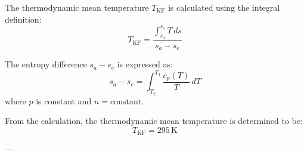 The thermodynamic mean temperature \( T_{\text{KF}} \) is calculated using the integral definition:  
\[
T_{\text{KF}} = \frac{\int_{s_a}^{s_e} T \, ds}{s_a - s_e}
\]  

The entropy difference \( s_a - s_e \) is expressed as:  
\[
s_a - s_e = \int_{T_2}^{T_1} \frac{c_{p}(T)}{T} \, dT
\]  
where \( p \) is constant and \( n = \text{constant} \).  

From the calculation, the thermodynamic mean temperature is determined to be:  
\[
T_{\text{KF}} = 295 \, \text{K}
\]  

---